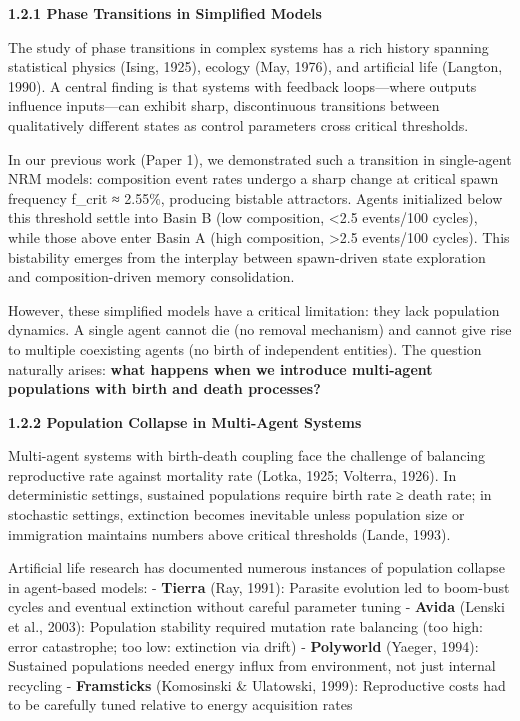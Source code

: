 \documentclass[
]{article}
\begin{document}
\textbf{1.2.1 Phase Transitions in Simplified Models}

The study of phase transitions in complex systems has a rich history
spanning statistical physics (Ising, 1925), ecology (May, 1976), and
artificial life (Langton, 1990). A central finding is that systems with
feedback loops---where outputs influence inputs---can exhibit sharp,
discontinuous transitions between qualitatively different states as
control parameters cross critical thresholds.

In our previous work (Paper 1), we demonstrated such a transition in
single-agent NRM models: composition event rates undergo a sharp change
at critical spawn frequency f\_crit ≈ 2.55\%, producing bistable
attractors. Agents initialized below this threshold settle into Basin B
(low composition, \textless2.5 events/100 cycles), while those above
enter Basin A (high composition, \textgreater2.5 events/100 cycles).
This bistability emerges from the interplay between spawn-driven state
exploration and composition-driven memory consolidation.

However, these simplified models have a critical limitation: they lack
population dynamics. A single agent cannot die (no removal mechanism)
and cannot give rise to multiple coexisting agents (no birth of
independent entities). The question naturally arises: \textbf{what
happens when we introduce multi-agent populations with birth and death
processes?}

\textbf{1.2.2 Population Collapse in Multi-Agent Systems}

Multi-agent systems with birth-death coupling face the challenge of
balancing reproductive rate against mortality rate (Lotka, 1925;
Volterra, 1926). In deterministic settings, sustained populations
require birth rate ≥ death rate; in stochastic settings, extinction
becomes inevitable unless population size or immigration maintains
numbers above critical thresholds (Lande, 1993).

Artificial life research has documented numerous instances of population
collapse in agent-based models: - \textbf{Tierra} (Ray, 1991): Parasite
evolution led to boom-bust cycles and eventual extinction without
careful parameter tuning - \textbf{Avida} (Lenski et al., 2003):
Population stability required mutation rate balancing (too high: error
catastrophe; too low: extinction via drift) - \textbf{Polyworld}
(Yaeger, 1994): Sustained populations needed energy influx from
environment, not just internal recycling - \textbf{Framsticks}
(Komosinski \& Ulatowski, 1999): Reproductive costs had to be carefully
tuned relative to energy acquisition rates
\end{document}
